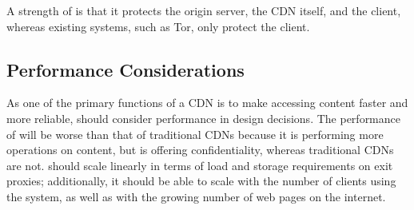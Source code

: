 A strength of \system{} is that it protects the origin server, the CDN itself, and the client, whereas 
existing systems, such as Tor, only protect the client.

\subsection{Performance Considerations}
As one of the primary functions of a CDN is to make accessing content faster and more 
reliable, \system{} should consider performance in design decisions.  The performance of \system{} will 
be worse than that of traditional CDNs because it is performing more operations on content, but \system{} 
is offering confidentiality, whereas traditional CDNs are not.  \system{} should scale linearly in terms of load 
and storage requirements on exit proxies; additionally, it should be able to 
scale with the number of clients using the system, as well as with the growing number of web pages on the internet.
